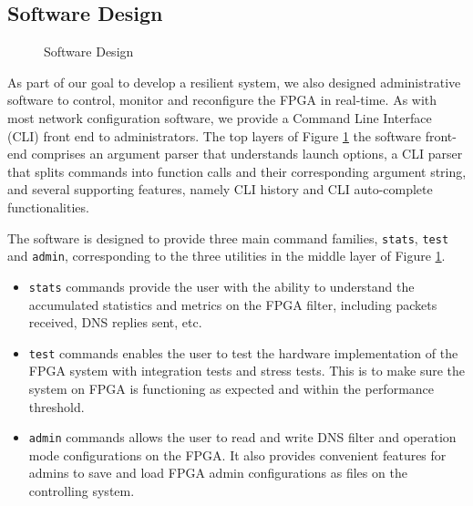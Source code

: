 \documentclass[a4paper]{report}
\newcommand{\code}{\texttt}
\begin{document}
\subsection{Software Design}

\begin{figure}[h!]
  \caption{Software Design}
  \label{fig:software-design}
\end{figure}

As part of our goal to develop a resilient system, we also designed administrative software to control, monitor and reconfigure the FPGA in real-time. As with most network configuration software, we provide a Command Line Interface (CLI) front end to administrators. The top layers of Figure \ref{fig:software-design} the software front-end comprises an argument parser that understands launch options, a CLI parser that splits commands into function calls and their corresponding argument string, and several supporting features, namely CLI history and CLI auto-complete functionalities.

The software is designed to provide three main command families, \code{stats}, \code{test} and \code{admin}, corresponding to the three utilities in the middle layer of Figure \ref{fig:software-design}. 
\begin{itemize}
    \item \code{stats} commands provide the user with the ability to understand the accumulated statistics and metrics on the FPGA filter, including packets received, DNS replies sent, etc.
    \item \code{test} commands enables the user to test the hardware implementation of the FPGA system with integration tests and stress tests. This is to make sure the system on FPGA is functioning as expected and within the performance threshold.
    \item \code{admin} commands allows the user to read and write DNS filter and operation mode configurations on the FPGA. It also provides convenient features for admins to save and load FPGA admin configurations as files on the controlling system.
\end{itemize}
\end{document}
